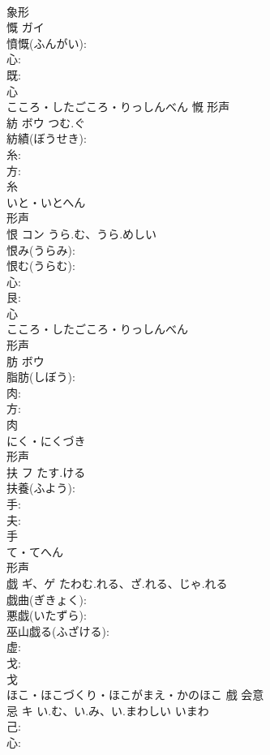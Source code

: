 \documentclass[8pt]{extreport}
\begin{document}
\begin{CJK}{UTF8}{min}
\\	象形 
\\	慨	ガイ			
\\	憤慨(ふんがい): 
\\	心: 
\\	既: 
\\	心	
\\	こころ・したごころ・りっしんべん	慨	形声 
\\	紡	ボウ	つむ.ぐ		
\\	紡績(ぼうせき): 
\\	糸: 
\\	方: 
\\	糸	
\\	いと・いとへん	
\\	形声 
\\	恨	コン	うら.む、うら.めしい		
\\	恨み(うらみ): 
\\	恨む(うらむ): 
\\	心: 
\\	艮: 
\\	心	
\\	こころ・したごころ・りっしんべん	
\\	形声 
\\	肪	ボウ			
\\	脂肪(しぼう): 
\\	肉: 
\\	方: 
\\	肉	
\\	にく・にくづき	
\\	形声 
\\	扶	フ	たす.ける		
\\	扶養(ふよう): 
\\	手: 
\\	夫: 
\\	手	
\\	て・てへん	
\\	形声 
\\	戯	ギ、ゲ	たわむ.れる、ざ.れる、じゃ.れる		
\\	戯曲(ぎきょく): 
\\	悪戯(いたずら): 
\\	巫山戯る(ふざける): 
\\	虚: 
\\	戈: 
\\	戈	
\\	ほこ・ほこづくり・ほこがまえ・かのほこ	戲	会意 
\\	忌	キ	い.む、い.み、い.まわしい	いまわ	
\\	己: 
\\	心: 

\end{CJK}
\end{document}
